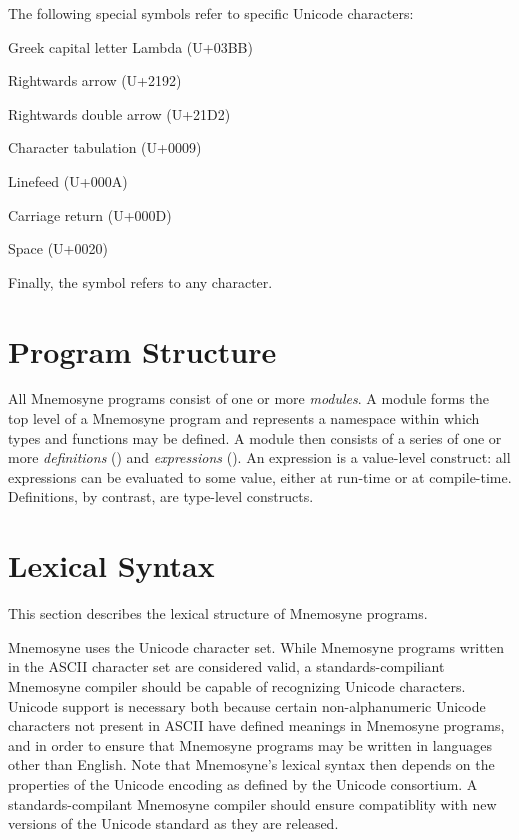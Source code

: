 The following special symbols refer to specific Unicode characters:
\begin{description}[leftmargin=3cm,labelindent=\parindent]
    \item{} Greek capital letter Lambda (U+03BB)
    \item{} Rightwards arrow (U+2192)
    \item{} Rightwards double arrow (U+21D2)
    \item{} Character tabulation (U+0009)
    \item{} Linefeed (U+000A)
    \item{} Carriage return (U+000D)
    \item{} Space (U+0020)
\end{description}

Finally, the symbol  refers to any character.

\section{Program Structure}

All Mnemosyne programs consist of one or more \textit{modules}. A module forms the top level of a Mnemosyne program and represents a namespace within which types and functions may be defined. A module then consists of a series of one or more \textit{definitions} () and \textit{expressions} (). An expression is a value-level construct: all expressions can be evaluated to some value, either at run-time or at compile-time. Definitions, by contrast, are type-level constructs.

\section{Lexical Syntax}\label{sec:lexical}
This section describes the lexical structure of Mnemosyne programs.

Mnemosyne uses the Unicode character set. While Mnemosyne programs written in the ASCII character set are considered valid, a standards-compiliant Mnemosyne compiler should be capable of recognizing Unicode characters. Unicode support is necessary both because certain non-alphanumeric Unicode characters not present in ASCII have defined meanings in Mnemosyne programs, and in order to ensure that Mnemosyne programs may be written in languages other than English. Note that Mnemosyne's lexical syntax then depends on the properties of the Unicode encoding as defined by the Unicode consortium. A standards-compilant Mnemosyne compiler should ensure compatiblity with new versions of the Unicode standard as they are released.

